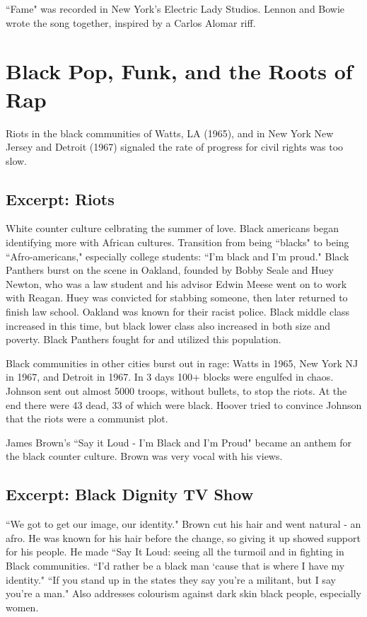 \documentclass[12pt, a4paper, twoside, openright, titlepage]{book}
\begin{document}
``Fame" was recorded in New York's Electric Lady Studios. Lennon and Bowie wrote the song together, inspired by a Carlos Alomar riff. 



\chapter{Black Pop, Funk, and the Roots of Rap}


Riots in the black communities of Watts, LA (1965), and in New York New Jersey and Detroit (1967) signaled the rate of progress for civil rights was too slow.


\section{Excerpt: Riots}


White counter culture celbrating the summer of love. Black americans began identifying more with African cultures. Transition from being ``blacks" to being ``Afro-americans," especially college students: ``I'm black and I'm proud." Black Panthers burst on the scene in Oakland, founded by Bobby Seale and Huey Newton, who was a law student and his advisor Edwin Meese went on to work with Reagan. Huey was convicted for stabbing someone, then later returned to finish law school. Oakland was known for their racist police. Black middle class increased in this time, but black lower class also increased in both size and poverty. Black Panthers fought for and utilized this population. 


Black communities in other cities burst out in rage: Watts in 1965, New York NJ in 1967, and Detroit in 1967. In 3 days 100+ blocks were engulfed in chaos. Johnson sent out almost 5000 troops, without bullets, to stop the riots. At the end there were 43 dead, 33 of which were black. Hoover tried to convince Johnson that the riots were a communist plot.


James Brown's ``Say it Loud - I'm Black and I'm Proud" became an anthem for the black counter culture. Brown was very vocal with his views.

\section{Excerpt: Black Dignity TV Show}

``We got to get our image, our identity." Brown cut his hair and went natural - an afro. He was known for his hair before the change, so giving it up showed support for his people. He made ``Say It Loud: seeing all the turmoil and in fighting in Black communities. ``I'd rather be a black man `cause that is where I have my identity." ``If you stand up in the states they say you're a militant, but I say you're a man." Also addresses colourism against dark skin black people, especially women.
\end{document}
